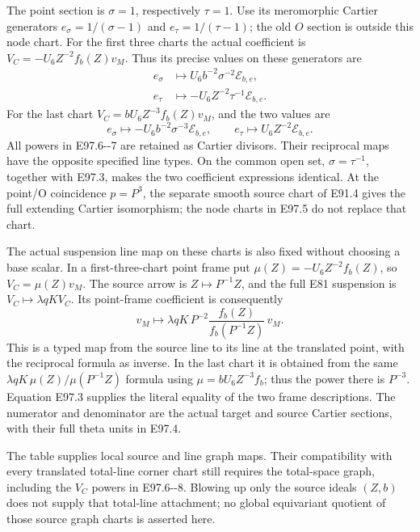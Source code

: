 The point section is \(\sigma=1\), respectively
\(\tau=1\). Use its meromorphic Cartier generators
\(e_\sigma=1/(\sigma-1)\) and
\(e_\tau=1/(\tau-1)\); the old \(O\) section is
outside this node chart. For the first three charts
the actual coefficient is
\(V_C=-U_6Z^{-2}f_b(Z)v_M\). Thus its precise
values on these generators are
\[
\begin{aligned}
 e_\sigma&\longmapsto
       U_6b^{-2}\sigma^{-2}\mathcal E_{b,e},\\
 e_\tau&\longmapsto
       -U_6Z^{-2}\tau^{-1}\mathcal E_{b,e}.
\end{aligned}                                                   \tag{E97.6}
\]
For the last chart \(V_C=bU_6Z^{-3}f_b(Z)v_M\),
and the two values are
\[
 e_\sigma\longmapsto
       -U_6b^{-2}\sigma^{-3}\mathcal E_{b,e},
 \qquad
 e_\tau\longmapsto U_6Z^{-2}\mathcal E_{b,e}.
 \tag{E97.7}
\]
All powers in E97.6-\/-7 are retained as Cartier
divisors. Their reciprocal maps have the opposite
specified line types. On the common open set,
\(\sigma=\tau^{-1}\), together with E97.3, makes
the two coefficient expressions identical. At the
point/O coincidence \(p=P^3\), the separate smooth
source chart of E91.4 gives the full extending
Cartier isomorphism; the node charts in E97.5 do
not replace that chart.

The actual suspension line map on these charts is
also fixed without choosing a base scalar. In a
first-three-chart point frame put
\(\mu(Z)=-U_6Z^{-2}f_b(Z)\), so \(V_C=\mu(Z)v_M\).
The source arrow is \(Z\mapsto P^{-1}Z\), and
the full E81 suspension is \(V_C\mapsto\lambda qK V_C\).
Its point-frame coefficient is consequently
\[
 v_M\longmapsto
 \lambda qK\,P^{-2}
        \frac{f_b(Z)}{f_b(P^{-1}Z)}\,v_M.
 \tag{E97.8}
\]
This is a typed map from the source line to its
line at the translated point, with the reciprocal
formula as inverse. In the last chart it is obtained
from the same \(\lambda qK\,\mu(Z)/\mu(P^{-1}Z)\)
formula using \(\mu=bU_6Z^{-3}f_b\); thus the
power there is \(P^{-3}\). Equation E97.3 supplies
the literal equality of the two frame descriptions.
The numerator and denominator are the actual target
and source Cartier sections, with their full theta
units in E97.4.

The table supplies local source and line graph maps.
Their compatibility with every translated total-line
corner chart still requires the total-space graph,
including the \(V_C\) powers in E97.6-\/-8.
Blowing up only the source ideals \((Z,b)\) does
not supply that total-line attachment; no global
equivariant quotient of those source graph charts
is asserted here.

